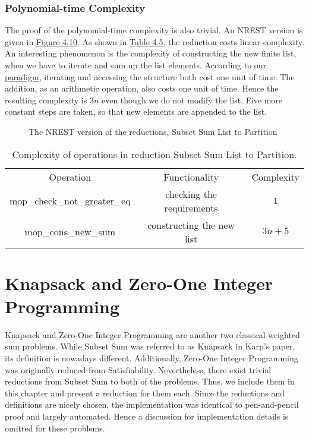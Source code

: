 \subsubsection{Polynomial-time Complexity}
The proof of the polynomial-time complexity is also trivial. 
An NREST version is given in \hyperref[fig:4.10]{Figure 4.10}. 
As shown in \hyperref[table:4.5]{Table 4.5}, the reduction costs linear complexity. 
An interesting phenomenon is the complexity of constructing the new finite list, when we have to iterate and sum up the list elements.
According to our \hyperref[para1]{paradigm}, iterating and accessing the structure both cost one unit of time. 
The addition, as an arithmetic operation, also costs one unit of time.
Hence the resulting complexity is $3n$ even though we do not modify the list.
Five more constant steps are taken, so that new elements are appended to the list.
\begin{figure}[!h]
    \caption{The NREST version of the reductions, Subset Sum List to Partition}
    \label{fig:4.10}
\end{figure}
\begin{table}[!h]
    \centering 
    \begin{tabular}{| c | c | c |}
        \hline 
        Operation & Functionality & Complexity \\ 
        \hhline{|=|=|=|}
        mop\_check\_not\_greater\_eq & checking the requirements & $1$ \\ 
        \hline 
        mop\_cons\_new\_sum & constructing the new list & $3n + 5$ \\ 
        \hline 
    \end{tabular}
    \caption{Complexity of operations in reduction Subset Sum List to Partition.}
    \label{table:4.5}
\end{table}

\section{Knapsack and Zero-One Integer Programming}
Knapsack and Zero-One Integer Programming are another two classical weighted sum problems. While Subset Sum was referred 
to as Knapsack in Karp's paper, its definition is nowadays different. Additionally, Zero-One Integer Programming 
was originally reduced from Satisfiability. Nevertheless, there exist trivial reductions from Subset Sum to both of the problems. Thus, 
we include them in this chapter and present a reduction for them each. 
Since the reductions and definitions are nicely chosen, the implementation was identical to pen-and-pencil proof 
and largely automated. Hence a discussion for implementation details is omitted for these problems.

